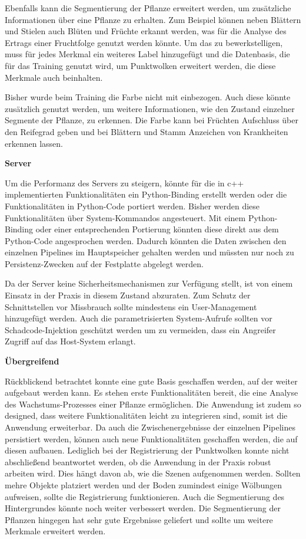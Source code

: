 \documentclass[12pt,titlepage, twoside]{article}
\begin{document}
Ebenfalls kann die Segmentierung der Pflanze erweitert werden, um zusätzliche Informationen über eine Pflanze zu erhalten. 
Zum Beispiel können neben Blättern und Stielen auch Blüten und Früchte erkannt werden, was für die Analyse des Ertrags einer Fruchtfolge genutzt werden könnte.
Um das zu bewerkstelligen, muss für jedes Merkmal ein weiteres Label hinzugefügt und die Datenbasis, die für das Training genutzt wird, 
um Punktwolken erweitert werden, die diese Merkmale auch beinhalten.

Bisher wurde beim Training die Farbe nicht mit einbezogen. Auch diese könnte zusätzlich genutzt werden, um weitere Informationen, wie den Zustand einzelner Segmente der Pflanze, zu erkennen. 
Die Farbe kann bei Früchten Aufschluss über den Reifegrad geben und bei Blättern und Stamm Anzeichen von Krankheiten erkennen lassen.

\textbf{Server}

Um die Performanz des Servers zu steigern, könnte für die in c++ implementierten Funktionalitäten ein Python-Binding erstellt werden oder die Funktionalitäten in Python-Code portiert werden. 
Bisher werden diese Funktionalitäten über System-Kommandos angesteuert. 
Mit einem Python-Binding oder einer entsprechenden Portierung könnten diese direkt aus dem Python-Code angesprochen werden. 
Dadurch könnten die Daten zwischen den einzelnen Pipelines im Hauptspeicher gehalten werden und müssten nur noch zu Persistenz-Zwecken auf der Festplatte abgelegt werden.

Da der Server keine Sicherheitsmechanismen zur Verfügung stellt, ist von einem Einsatz in der Praxis in diesem Zustand abzuraten. 
Zum Schutz der Schnittstellen vor Missbrauch sollte mindestens ein User-Management hinzugefügt werden. 
Auch die parametrisierten System-Aufrufe sollten vor Schadcode-Injektion geschützt werden um zu vermeiden, dass ein Angreifer Zugriff auf das Host-System erlangt.

\textbf{Übergreifend}

Rückblickend betrachtet konnte eine gute Basis geschaffen werden, auf der weiter aufgebaut werden kann. Es stehen erste Funktionalitäten bereit, die eine Analyse des Wachstums-Prozesses einer Pflanze ermöglichen. 
Die Anwendung ist zudem so designed, dass weitere Funktionalitäten leicht zu integrieren sind, somit ist die Anwendung erweiterbar. 
Da auch die Zwischenergebnisse der einzelnen Pipelines persistiert werden, können auch neue Funktionalitäten geschaffen werden, die auf diesen aufbauen.
Lediglich bei der Registrierung der Punktwolken konnte nicht abschließend beantwortet werden, ob die Anwendung in der Praxis robust arbeiten wird.
Dies hängt davon ab, wie die Szenen aufgenommen werden. Sollten mehre Objekte platziert werden und der Boden zumindest einige Wölbungen aufweisen, sollte die Registrierung funktionieren.
Auch die Segmentierung des Hintergrundes könnte noch weiter verbessert werden.
Die Segmentierung der Pflanzen hingegen hat sehr gute Ergebnisse geliefert und sollte um weitere Merkmale erweitert werden.
\end{document}
